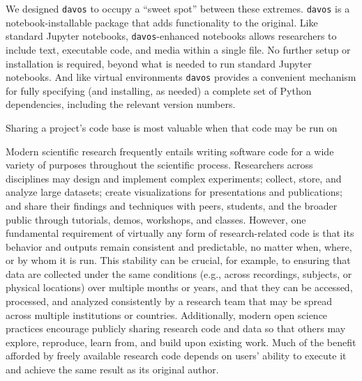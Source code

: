 \documentclass[preprint,12pt, a4paper]{elsarticle}
\begin{document}
We designed \texttt{davos} to occupy a ``sweet spot'' between these
extremes.  \texttt{davos} is a notebook-installable package that adds
functionality to the original.  Like standard Jupyter notebooks,
\texttt{davos}-enhanced notebooks allows researchers to include text,
executable code, and media within a single file.  No further setup or
installation is required, beyond what is needed to run standard
Jupyter notebooks.  And like virtual environments \texttt{davos}
provides a convenient mechanism for fully specifying (and installing,
as needed) a complete set of Python dependencies, including the
relevant version numbers.




Sharing a project's code base is most valuable when that code may be
run on 



Modern scientific research frequently entails writing software code
for a wide variety of purposes throughout the scientific process.
Researchers across disciplines may design and implement complex
experiments; collect, store, and analyze large datasets; create
visualizations for presentations and publications; and share their
findings and techniques with peers, students, and the broader public
through tutorials, demos, workshops, and classes.  However, one
fundamental requirement of virtually any form of research-related code
is that its behavior and outputs remain consistent and predictable, no
matter when, where, or by whom it is run.  This stability can be
crucial, for example, to ensuring that data are collected under the
same conditions (e.g., across recordings, subjects, or physical
locations)
over multiple months or years, and that they can be accessed,
processed, and analyzed consistently by a research team that may be
spread across multiple institutions or countries.  Additionally,
modern open science practices encourage publicly sharing research code
and data so that others may explore, reproduce, learn from, and build
upon existing work.  Much of the benefit afforded by freely available
research code depends on users' ability to execute it and achieve the
same result as its original author.
\end{document}
